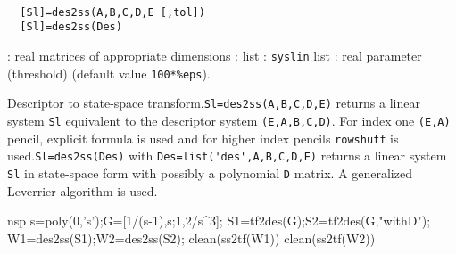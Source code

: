 \begin{mandesc}
   \\ %
\end{mandesc}
\begin{calling_sequence}
\begin{verbatim}
  [Sl]=des2ss(A,B,C,D,E [,tol])  
  [Sl]=des2ss(Des)  
\end{verbatim}
\end{calling_sequence}
\begin{parameters}
  \begin{varlist}
    : real matrices of appropriate dimensions
    : list
    : \verb!syslin! list
    : real parameter (threshold) (default value \verb!100*%eps!).
  \end{varlist}
\end{parameters}
\begin{mandescription}
  Descriptor to state-space transform.\verb!Sl=des2ss(A,B,C,D,E)! returns a
  linear system \verb!Sl! equivalent to the descriptor system
  \verb!(E,A,B,C,D)!.  For index one \verb!(E,A)! pencil, explicit formula is
  used and for higher index pencils \verb!rowshuff! is
  used.\verb!Sl=des2ss(Des)! with \verb!Des=list('des',A,B,C,D,E)! returns a
  linear system \verb!Sl! in state-space form with possibly a polynomial
  \verb!D! matrix.  A generalized Leverrier algorithm is used.
\end{mandescription}
\begin{examples}
  \begin{mintednsp}{nsp}
    s=poly(0,'s');G=[1/(s-1),s;1,2/s^3];
    S1=tf2des(G);S2=tf2des(G,"withD");
    W1=des2ss(S1);W2=des2ss(S2);
    clean(ss2tf(W1))
    clean(ss2tf(W2))
  \end{mintednsp}
\end{examples}
\begin{manseealso}
      
\end{manseealso}
